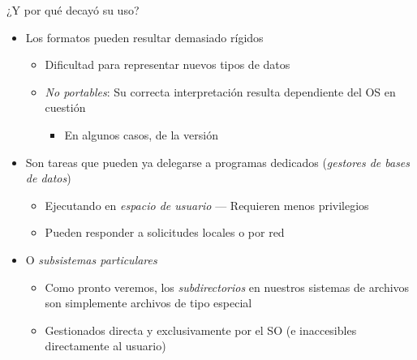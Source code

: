 \documentclass[presentation]{beamer}
\begin{document}
\begin{frame}[label={sec:org4e2646a}]{¿Y por qué decayó su uso?}
\begin{itemize}
\item Los formatos pueden resultar demasiado rígidos
\begin{itemize}
\item Dificultad para representar nuevos tipos de datos
\item \emph{No portables}: Su correcta interpretación resulta dependiente del
OS en cuestión
\begin{itemize}
\item En algunos casos, de la versión
\end{itemize}
\end{itemize}
\item Son tareas que pueden ya delegarse a programas dedicados (\emph{gestores
de bases de datos})
\begin{itemize}
\item Ejecutando en \emph{espacio de usuario} — Requieren menos privilegios
\item Pueden responder a solicitudes locales o por red
\end{itemize}
\item O \emph{subsistemas particulares}
\begin{itemize}
\item Como pronto veremos, los \emph{subdirectorios} en nuestros sistemas de
archivos son simplemente archivos de tipo especial
\item Gestionados directa y exclusivamente por el SO (e inaccesibles
directamente al usuario)
\end{itemize}
\end{itemize}
\end{frame}
\end{document}
